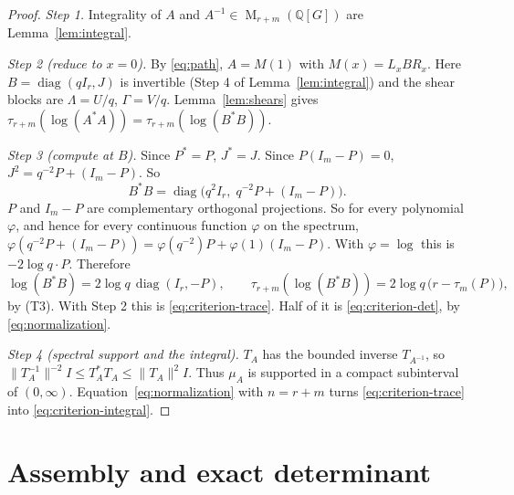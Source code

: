 \documentclass[11pt]{article}
\theoremstyle{remark}
\numberwithin{equation}{section}
\newcommand{\Q}{\mathbb Q}
\newcommand{\Mat}{\operatorname{M}}
\newcommand{\diag}{\operatorname{diag}}
\begin{document}
\begin{proof}
\emph{Step 1.} Integrality of $A$ and $A^{-1}\in\Mat_{r+m}(\Q[G])$ are Lemma~\ref{lem:integral}.

\emph{Step 2 (reduce to $x=0$).} By \eqref{eq:path}, $A=M(1)$ with $M(x)=L_xBR_x$. Here $B=\diag(qI_r,J)$ is invertible (Step 4 of Lemma~\ref{lem:integral}) and the shear blocks are $\Lambda=U/q$, $\Gamma=V/q$. Lemma~\ref{lem:shears} gives
$\tau_{r+m}(\log(A^*A))=\tau_{r+m}(\log(B^*B))$.

\emph{Step 3 (compute at $B$).} Since $P^*=P$, $J^*=J$. Since $P(I_m-P)=0$, $J^2=q^{-2}P+(I_m-P)$. So
\[
 B^*B=\diag\bigl(q^2I_r,\;q^{-2}P+(I_m-P)\bigr).
\]
$P$ and $I_m-P$ are complementary orthogonal projections. So for every polynomial $\varphi$, and hence for every continuous function $\varphi$ on the spectrum, $\varphi(q^{-2}P+(I_m-P))=\varphi(q^{-2})P+\varphi(1)(I_m-P)$. With $\varphi=\log$ this is $-2\log q\cdot P$. Therefore
\[
 \log(B^*B)=2\log q\,\diag(I_r,-P),
 \qquad
 \tau_{r+m}(\log(B^*B))=2\log q\,\bigl(r-\tau_m(P)\bigr),
\]
by (T3). With Step 2 this is \eqref{eq:criterion-trace}. Half of it is \eqref{eq:criterion-det}, by \eqref{eq:normalization}.

\emph{Step 4 (spectral support and the integral).} $T_A$ has the bounded inverse $T_{A^{-1}}$, so
$\|T_A^{-1}\|^{-2}I\le T_A^*T_A\le\|T_A\|^2I$. Thus $\mu_A$ is supported in a compact subinterval of $(0,\infty)$. Equation~\eqref{eq:normalization} with $n=r+m$ turns \eqref{eq:criterion-trace} into \eqref{eq:criterion-integral}.
\end{proof}

\section{Assembly and exact determinant}
\label{sec:assembly}
\end{document}
